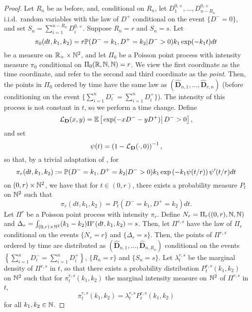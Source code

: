 \begin{proof}
 Let $R_n$ be as before, and, conditional on $R_n$, let $D^{0,+}_1,\dots,D^{0,+}_{n-R_n}$ i.i.d.\ random variables with the law of $D^+$ conditional on the event $\{D^-=0\}$, and set $S_n=\sum_{i=1}^{n-R_n}D^{0,+}_i$. Suppose $R_n=r$ and $S_n=s$. 
Let
$$\pi_0(dt,k_1,k_2)=r\P(D^-=k_1,D^+=k_2|D^->0)k_1\exp(-k_1 t)dt$$
be a measure on $\R_+\times \N^2$, and let $\Pi_0$ be a Poisson point process with intensity measure $\pi_0$ conditional on $\Pi_0(\R,\N,\N)=r$. We view the first coordinate as the time coordinate, and refer to the second and third coordinate as the \emph{point}. Then, the points in $\Pi_0$ ordered by time have the same law as $(\mathbf{\widehat{D}}_{n,1},\dots,\mathbf{\widehat{D}}_{r,n})$ (before conditioning on the event $\{\sum_{i=1}^nD^-_i=\sum_{i=1}^nD^+_i\}$).  
The intensity of this process is not constant in $t$, so we perform a time change. Define
$$\cL_{\mathbf{D}}(x,y)=\E\left[\left.\exp(-xD^--yD^+)\right|D^->0 \right],$$
and set 
$$\psi(t)=\left(1-\cL_{\mathbf{D}}(\cdot,0)\right)^{-1},$$
so that, by a trivial adaptation of \cite[Lemma 4.1]{josephComponentSizesCritical2014}, for 
$$\pi_r(dt,k_1,k_2):=\P(D^-=k_1,D^+=k_2|D^->0)k_1\exp\left(-k_1 \psi(t/r)\right)\psi'(t/r)dt$$
on $(0,r)\times \N^2$, we have that for $t\in (0,r)$, there exists a probability measure $P_t$ on $\N^2$ such that
$$\pi_r(dt,k_1,k_2)=P_t(D^-=k_1,D^+=k_2)dt.$$
Let ${\Pi}^r$ be a Poisson point process with intensity $\pi_r$. Define $N_r= {\Pi}_r((0,r),\N,\N)$ and $\Delta_r=\int_{(0,r)\times \N^2}(k_1-k_2){\Pi}^r(dt,k_1,k_2)=s$. Then, let ${\Pi}^{r,s}$ have the law of ${\Pi}_r$ conditional on the events $\{N_r=r\}$ and $\{\Delta_r=s\}$. Then, the points of ${\Pi}^{r,s}$ ordered by time are distributed as $(\mathbf{\widehat{D}}_{n,1},\dots,\mathbf{\widehat{D}}_{n,R_n})$ conditional on the events $\left\{\sum_{i=1}^nD^-_i=\sum_{i=1}^nD^+_i\right\}$, $\{R_n=r\}$ and $\{S_n=s\}$. Let ${\lambda}^{r,s}_t$ be the marginal density of ${\Pi}^{r,s}$ in $t$, so that there exists a probability distribution ${P}^{r,s}_t(k_1,k_2)$ on $\N^2$ such that for ${\pi}^{r,s}_t(k_1,k_2)$ the marginal intensity measure on $\N^2$ of ${\Pi}^{r,s}$ in $t$, 
$${\pi}^{r,s}_t(k_1,k_2)={\lambda}^{r,s}_t{P}^{r,s}_t(k_1,k_2)$$
for all $k_1,k_2\in \N$.


\end{proof}
